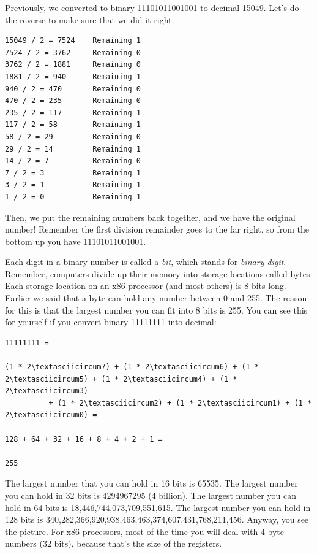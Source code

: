 Previously, we converted to binary 11101011001001 to decimal 15049.  Let's
do the reverse to make sure that we did it right:

\begin{simpletyping}
\begin{lstlisting}
15049 / 2 = 7524    Remaining 1
7524 / 2 = 3762     Remaining 0
3762 / 2 = 1881     Remaining 0
1881 / 2 = 940      Remaining 1
940 / 2 = 470       Remaining 0
470 / 2 = 235       Remaining 0
235 / 2 = 117       Remaining 1
117 / 2 = 58        Remaining 1
58 / 2 = 29         Remaining 0
29 / 2 = 14         Remaining 1
14 / 2 = 7          Remaining 0
7 / 2 = 3           Remaining 1
3 / 2 = 1           Remaining 1
1 / 2 = 0           Remaining 1
\end{lstlisting}
\end{simpletyping}

Then, we put the remaining numbers back together, and we have the original
number!  Remember the first division remainder goes to the far right, so
from the bottom up you have 11101011001001.

Each digit in a binary number is called a \emph{bit}, which
stands for \emph{binary digit}.  Remember, computers divide up
their memory into storage locations called bytes.  Each storage location on an x86 processor (and most others) is 8 bits long.  Earlier we said
that a byte can hold any number between 0 and 255.  The reason for this
is that the largest number you can fit into 8 bits is 255.  You can
see this for yourself if you convert binary 11111111 into decimal:

\begin{simpletyping}
\begin{lstlisting}
11111111 =

(1 * 2\textasciicircum7) + (1 * 2\textasciicircum6) + (1 * 2\textasciicircum5) + (1 * 2\textasciicircum4) + (1 * 2\textasciicircum3) 
          + (1 * 2\textasciicircum2) + (1 * 2\textasciicircum1) + (1 * 2\textasciicircum0) = 

128 + 64 + 32 + 16 + 8 + 4 + 2 + 1 =

255
\end{lstlisting}
\end{simpletyping}

The largest number that you can hold in 16 bits is 65535.   The largest
number you can hold in 32 bits is 4294967295 (4 billion).  The largest
number you can hold in 64 bits is 18,446,744,073,709,551,615.  The
largest number you can hold in 128 bits is
340,282,366,920,938,463,463,374,607,431,768,211,456.  Anyway, you
see the picture.  For x86 processors, most of the time you will deal with 4-byte
numbers (32 bits), because that's the size of the registers.

